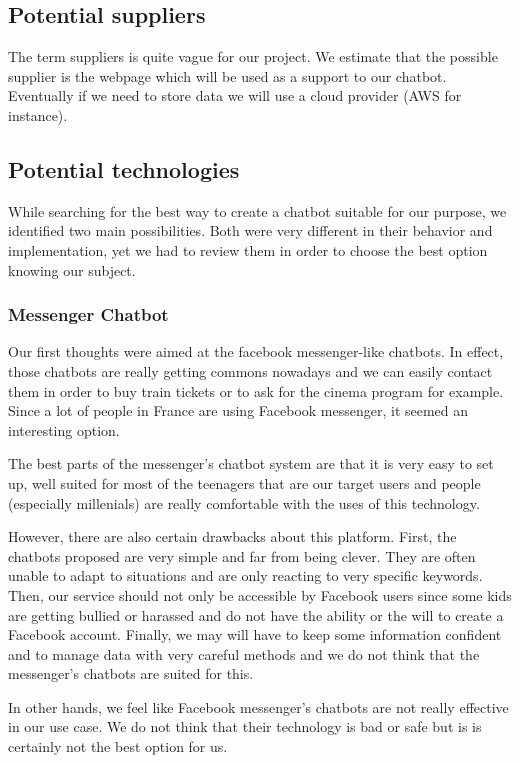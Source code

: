 \documentclass{article}
\begin{document}
\subsection{Potential suppliers}

The term suppliers is quite vague for our project. We estimate that the possible supplier is the webpage which will be used as a support to our chatbot. Eventually if we need to store data we will use a cloud provider (AWS for instance).

\subsection{Potential technologies}

While searching for the best way to create a chatbot suitable for our purpose, we identified two main possibilities.
Both were very different in their behavior and implementation, yet we had to review them in order to choose the best option knowing our subject.

\subsubsection{Messenger Chatbot}

Our first thoughts were aimed at the facebook messenger-like chatbots. In effect, those chatbots are really getting commons nowadays and we can easily contact them in order to buy train tickets or to ask for the cinema program for example.
Since a lot of people in France are using Facebook messenger, it seemed an interesting option.

The best parts of the messenger's chatbot system are that it is very easy to set up, well suited for most of the teenagers that are our target users and people (especially millenials) are really comfortable with the uses of this technology.

However, there are also certain drawbacks about this platform. First, the chatbots proposed are very simple and far from being clever. They are often unable to adapt to situations and are only reacting to very specific keywords.
Then, our service should not only be accessible by Facebook users since some kids are getting bullied or harassed
and do not have the ability or the will to create a Facebook account. Finally, we may will have to keep some information confident and to manage data with very careful methods and we do not think that the messenger's chatbots are suited for this.

In other hands, we feel like Facebook messenger's chatbots are not really effective in our use case. We do not think that
their technology is bad or safe but is is certainly not the best option for us.
\end{document}
